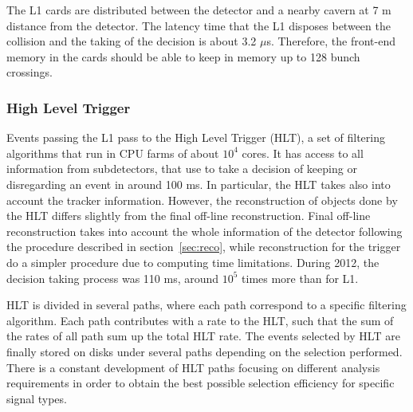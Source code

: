 The L1 cards are distributed between the detector and a nearby cavern at 7 m distance from the detector. The latency time that the L1 disposes between the collision and the taking of the decision is about 3.2 $\mu$s. Therefore, the front-end memory in the cards should be able to keep in memory up to 128 bunch crossings. 

\subsubsection{High Level Trigger}
\label{sec:HLT}


Events passing the L1 pass to the High Level Trigger (HLT), a set of filtering algorithms that run in CPU farms of about $10^{4}$ cores. It has access to all information from subdetectors, that use to take a decision of keeping or disregarding an event in around 100 ms. In particular, the HLT takes also into account the tracker information. However, the reconstruction of objects done by the HLT differs slightly from the final off-line reconstruction. Final off-line reconstruction takes into account the whole information of the detector following the procedure described in section~\ref{sec:reco}, while reconstruction for the trigger do a simpler procedure due to computing time limitations. During 2012, the decision taking process was 110 ms, around $10^{5}$ times more than for L1.

HLT is divided in several paths, where each path correspond to a specific filtering algorithm. Each path contributes with a rate to the HLT, such that the sum of the rates of all path sum up the total HLT rate. The events selected by HLT are finally stored on disks under several paths depending on the selection performed. There is a constant development of HLT paths focusing on different analysis requirements in order to obtain the best possible selection efficiency for specific signal types. 

